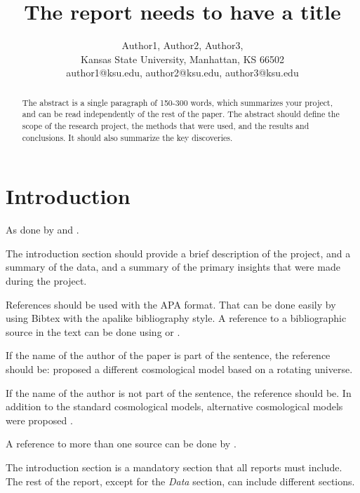 \documentclass[article,pdftex,10pt,a4paper,twocolumn]{article}
\begin{document}
\title{The report needs to have a title}

\author{Author1, Author2, Author3, \\ \small Kansas State University, Manhattan, KS 66502 \\ \small author1@ksu.edu, author2@ksu.edu, author3@ksu.edu}

\date{}

\maketitle

\begin{abstract}
The abstract is a single paragraph of 150-300 words, which summarizes your project, and can be read independently of the rest of the paper. The abstract should define the scope of the research project, the methods that were used, and the results and conclusions. It should also summarize the key discoveries.
\end{abstract}


\section{Introduction}
\label{synopsis}


As done by \cite{waller2013data} and \cite{dhar2013data}.


The introduction section should provide a brief description of the project, and a summary of the data, and a summary of the primary insights that were made during the project.




References should be used with the APA format. That can be done easily by using Bibtex with the apalike bibliography style. A reference to a bibliographic source in the text can be done using \cite{ozsvath2001approaches} or \citep{ellis1979homogeneity}.

If the name of the author of the paper is part of the sentence, the reference should be: \cite{ozsvath2001approaches} proposed a different cosmological model based on a rotating universe. 

If the name of the author is not part of the sentence, the reference should be. In addition to the standard cosmological models, alternative cosmological models were proposed \citep{ozsvath2001approaches}.

A reference to more than one source can be done by \citep{ozsvath1962finite,godel1949example}.

The introduction section is a mandatory section that all reports must include. The rest of the report, except for the {\it Data} section, can include different sections.
\end{document}
